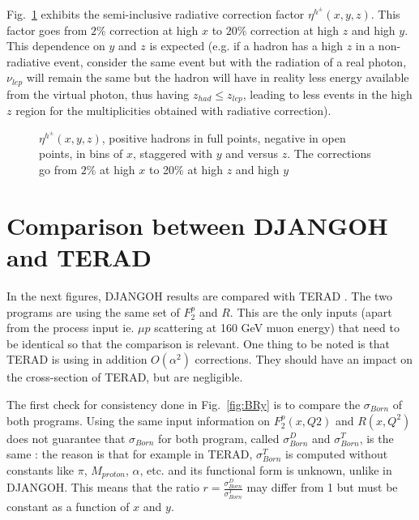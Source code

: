 Fig.~\ref{fig:hadz_ratio} exhibits the semi-inclusive radiative correction factor $\eta^{h^{\pm}}(x,y,z)$. This factor goes from $2$\% correction at high $x$ to $20$\% correction at high $z$ and high $y$. This dependence on $y$ and $z$ is expected (e.g. if a hadron has a high $z$ in a non-radiative event, consider the same event but with the radiation of a real photon, $\nu_{lep}$ will remain the same but the hadron will have in reality less energy available from the virtual photon, thus having $z_{had} \leq z_{lep}$, leading to less events in the high $z$ region for the multiplicities obtained with radiative correction).

\begin{figure}[!htb]
\centerline{}
\caption{$\eta^{h^{\pm}}(x,y,z)$, positive hadrons in full points, negative in open points, in bins of $x$, staggered with $y$ and versus $z$.
The corrections go from $2$\% at high $x$ to 20\% at high $z$ and high $y$}\label{fig:hadz_ratio}
\end{figure}


\section{Comparison between DJANGOH and TERAD}

In the next figures, DJANGOH results are compared with TERAD \cite{TERAD}. The two programs are using the same set of $F^{p}_{2}$ and $R$. This are the only inputs (apart from the process input ie. $\mu p$ scattering at 160 GeV muon energy) that need to be identical so that the comparison is relevant. One thing to be noted is that TERAD is using in addition $O(\alpha^2)$ corrections. They should have an impact on the cross-section of TERAD, but are negligible.

The first check for consistency done in Fig.~\ref{fig:BRy} is to compare the $\sigma_{Born}$ of both programs. Using the same input information on $F^{p}_{2}(x,Q2)$ and $R(x, Q^2)$ does not guarantee that $\sigma_{Born}$ for both program, called $\sigma^{D}_{Born}$ and $\sigma^{T}_{Born}$, is the same : the reason is that for example in TERAD, $\sigma^{T}_{Born}$ is computed without constants like $\pi$, $M_{proton}$, $\alpha$, etc. and its functional form is unknown, unlike in DJANGOH. This means that the ratio $r=\frac{\sigma^{D}_{Born}}{\sigma^{T}_{Born}}$ may differ from 1 but must be constant as a function of $x$ and $y$.

